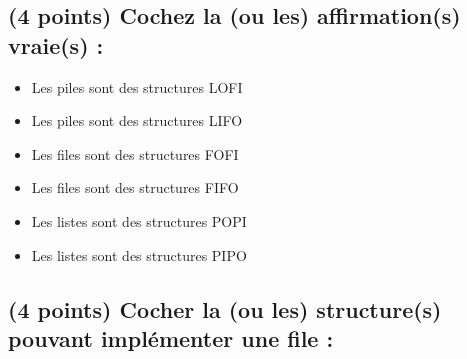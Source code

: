 \documentclass[11pt,a4paper]{article}
\begin{document}
\MakeExamTitle                   %




\renewcommand{\thesubsection}{\arabic{subsection}} %



\vfillFirst

\subsection{(4 points) Cochez la (ou les) affirmation(s) vraie(s) : }

\begin{itemize}
  \item[\CaseCoche] Les piles sont des structures LOFI \\
  \item[\checkmark] Les piles sont des structures LIFO \\
  \item[\CaseCoche] Les files sont des structures FOFI \\
  \item[\checkmark] Les files sont des structures FIFO \\
  \item[\CaseCoche] Les listes sont des structures POPI \\
  \item[\CaseCoche] Les listes sont des structures PIPO \\
\end{itemize}


\bigskip
\vspace*{1cm}

\subsection{(4 points) Cocher la (ou les) structure(s) pouvant implémenter une file : }
\end{document}
